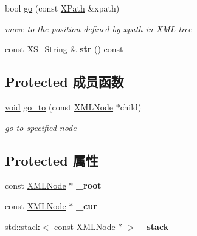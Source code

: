 \begin{DoxyCompactItemize}
\mbox{\label{struct_x_m_l_storage_1_1const___x_m_l_pos_ad0784ac139786351b9aea370ab0c004f}} 
bool \hyperlink{struct_x_m_l_storage_1_1const___x_m_l_pos_ad0784ac139786351b9aea370ab0c004f}{go} (const \hyperlink{struct_x_m_l_storage_1_1_x_path}{X\+Path} \&xpath)
\begin{DoxyCompactList}\small\item\em move to the position defined by xpath in X\+ML tree \end{DoxyCompactList}\item 
\mbox{\label{struct_x_m_l_storage_1_1const___x_m_l_pos_ada8f55ff1fb5b15bfb011b43870b10f3}} 
const \hyperlink{struct_x_m_l_storage_1_1_x_s___string}{X\+S\+\_\+\+String} \& {\bfseries str} () const
\end{DoxyCompactItemize}
\subsection*{Protected 成员函数}
\begin{DoxyCompactItemize}
\item 
\mbox{\label{struct_x_m_l_storage_1_1const___x_m_l_pos_a7f34aad5277ff9831f9341762afc28ae}} 
\hyperlink{interfacevoid}{void} \hyperlink{struct_x_m_l_storage_1_1const___x_m_l_pos_a7f34aad5277ff9831f9341762afc28ae}{go\+\_\+to} (const \hyperlink{struct_x_m_l_storage_1_1_x_m_l_node}{X\+M\+L\+Node} $\ast$child)
\begin{DoxyCompactList}\small\item\em go to specified node \end{DoxyCompactList}\end{DoxyCompactItemize}
\subsection*{Protected 属性}
\begin{DoxyCompactItemize}
\item 
\mbox{\label{struct_x_m_l_storage_1_1const___x_m_l_pos_a0b12a4c5e600956cfb92c82c4c137005}} 
const \hyperlink{struct_x_m_l_storage_1_1_x_m_l_node}{X\+M\+L\+Node} $\ast$ {\bfseries \+\_\+root}
\item 
\mbox{\label{struct_x_m_l_storage_1_1const___x_m_l_pos_a8eeb4ca1c01b3e3e09286c58bea48154}} 
const \hyperlink{struct_x_m_l_storage_1_1_x_m_l_node}{X\+M\+L\+Node} $\ast$ {\bfseries \+\_\+cur}
\item 
\mbox{\label{struct_x_m_l_storage_1_1const___x_m_l_pos_ab247967b5e17b438dc00308940e176d2}} 
std\+::stack$<$ const \hyperlink{struct_x_m_l_storage_1_1_x_m_l_node}{X\+M\+L\+Node} $\ast$ $>$ {\bfseries \+\_\+stack}
\end{DoxyCompactItemize}



